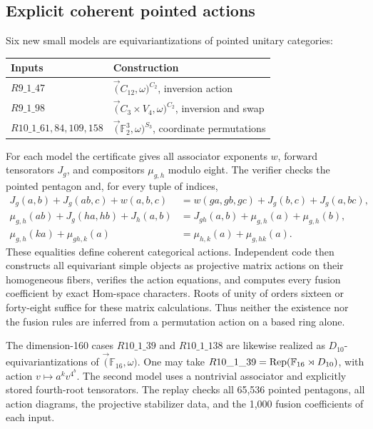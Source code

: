 \subsection{Explicit coherent pointed actions}
Six new small models are equivariantizations of pointed unitary categories:
\begin{center}
\begin{tabular}{ll}
\toprule Inputs & Construction \\\midrule
$R9\_1\_47$ & $\Vec(C_{12},\omega)^{C_2}$, inversion action \\
$R9\_1\_98$ & $\Vec(C_3\times V_4,\omega)^{C_2}$, inversion and swap \\
$R10\_1\_61,84,109,158$ & $\Vec(\mathbb F_2^3,\omega)^{S_3}$, coordinate permutations \\
\bottomrule
\end{tabular}
\end{center}
For each model the certificate gives all associator exponents $w$, forward
tensorators $J_g$, and compositors $\mu_{g,h}$ modulo eight. The verifier
checks the pointed pentagon and, for every tuple of indices,
\begin{align*}
J_g(a,b)+J_g(ab,c)+w(a,b,c)
 &=w(ga,gb,gc)+J_g(b,c)+J_g(a,bc),\\
\mu_{g,h}(ab)+J_g(ha,hb)+J_h(a,b)
 &=J_{gh}(a,b)+\mu_{g,h}(a)+\mu_{g,h}(b),\\
\mu_{g,h}(ka)+\mu_{gh,k}(a)
 &=\mu_{h,k}(a)+\mu_{g,hk}(a).
\end{align*}
These equalities define coherent categorical actions. Independent code then
constructs all equivariant simple objects as projective matrix actions on
their homogeneous fibers, verifies the action equations, and computes every
fusion coefficient by exact Hom-space characters. Roots of unity of orders
sixteen or forty-eight suffice for these matrix calculations. Thus neither
the existence nor the fusion rules are inferred from a permutation action
on a based ring alone.

The dimension-160 cases $R10\_1\_39$ and $R10\_1\_138$ are likewise
realized as $D_{10}$-equivariantizations of $\Vec(\mathbb F_{16},\omega)$.
One may take $R10\_1\_39=\operatorname{Rep}(\mathbb F_{16}\rtimes D_{10})$, with
action $v\mapsto a^kv^{4^b}$. The second model uses a nontrivial associator
and explicitly stored fourth-root tensorators. The replay checks all 65,536
pointed pentagons, all action diagrams, the projective stabilizer data,
and the 1,000 fusion coefficients of each input.

